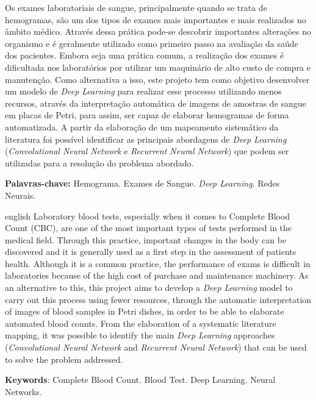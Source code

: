 \documentclass[
	10pt,			 	  %
	oneside,
	a4paper,			  %
	chapter=TITLE,		  %
	english,			 %
	brazil				 %
	]{abntex2}
\begin{document}
\setlength{\absparsep}{18pt} %
\begin{resumo}
	Os exames laboratoriais de sangue, principalmente quando se trata de hemogramas, são um dos tipos de exames mais importantes e mais realizados no âmbito médico. Através dessa prática pode-se descobrir importantes alterações no organismo e é geralmente utilizado como primeiro passo na avaliação da saúde dos pacientes. Embora seja uma prática comum, a realização dos exames é dificultada nos laboratórios por utilizar um maquinário de alto custo de compra e manutenção. Como alternativa a isso, este projeto tem como objetivo desenvolver um modelo de \emph{Deep Learning} para realizar esse processo utilizando menos recursos, através da interpretação automática de imagens de amostras de sangue em placas de Petri, para assim, ser capaz de elaborar hemogramas de forma automatizada. A partir da elaboração de um mapeamento sistemático da literatura foi possível identificar as principais abordagens de \emph{Deep Learning} (\emph{Convolutional Neural Network} e \emph{Recurrent Neural Network}) que podem ser utilizadas para a resolução do problema abordado.
			
	\textbf{Palavras-chave:} Hemograma. Exames de Sangue. \emph{Deep Learning}. Redes Neurais.
\end{resumo}

\begin{resumo}[Abstract]
	\begin{otherlanguage*}{english}
		Laboratory blood tests, especially when it comes to Complete Blood Count (CBC), are one of the most important types of tests performed in the medical field. Through this practice, important changes in the body can be discovered and it is generally used as a first step in the assessment of patients health. Although it is a common practice, the performance of exams is difficult in laboratories because of the high cost of purchase and maintenance machinery. As an alternative to this, this project aims to develop a \emph{Deep Learning} model to carry out this process using fewer resources, through the automatic interpretation of images of blood samples in Petri dishes, in order to be able to elaborate automated blood counts. From the elaboration of a systematic literature mapping, it was possible to identify the main \emph{Deep Learning} approaches (\emph{Convolutional Neural Network} and \emph{Recurrent Neural Network}) that can be used to solve the problem addressed.
		\vspace{\onelineskip}
		\noindent 
						
		\textbf{Keywords}: Complete Blood Count. Blood Test. Deep Learning. Neural Networks.
	\end{otherlanguage*}
\end{resumo}
\end{document}
